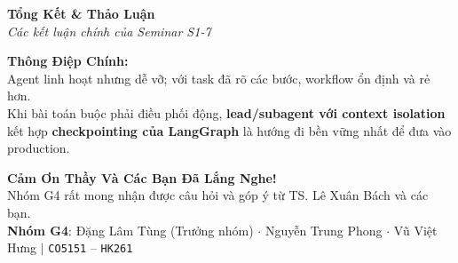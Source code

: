 \documentclass[aspectratio=1610,10pt,xcolor={table}]{beamer}
\begin{document}
\begin{frame}[plain]

  \vspace{0.8cm}
  \begin{center}
    {\Large \textbf{\color{hcmutblue}Tổng Kết \& Thảo Luận}}\\[0.2cm]
    {\normalsize \textit{Các kết luận chính của Seminar S1-7}}\\[0.35cm]

    \begin{tcolorbox}[width=0.92\textwidth,colback=hcmutgray,colframe=hcmutblue!50,arc=2mm,boxrule=0.8pt]
      \centering\small
      \textbf{Thông Điệp Chính:}\\[0.1cm]
      \footnotesize
      Agent linh hoạt nhưng dễ vỡ; với task đã rõ các bước, workflow ổn định và rẻ hơn.\\
      Khi bài toán buộc phải điều phối động, \textbf{lead/subagent với context isolation} kết hợp \textbf{checkpointing của LangGraph} là hướng đi bền vững nhất để đưa vào production.
    \end{tcolorbox}

    \vspace{0.35cm}
    {\large \textbf{\color{hcmutblue}Cảm Ơn Thầy Và Các Bạn Đã Lắng Nghe!}}\\[0.15cm]
    {\small Nhóm G4 rất mong nhận được câu hỏi và góp ý từ TS. Lê Xuân Bách và các bạn.}\\[0.25cm]
    {\scriptsize \textbf{Nhóm G4}: Đặng Lâm Tùng (Trưởng nhóm) $\cdot$ Nguyễn Trung Phong $\cdot$ Vũ Việt Hưng $\vert$ \texttt{CO5151} -- \texttt{HK261}}
  \end{center}
\end{frame}
\end{document}
